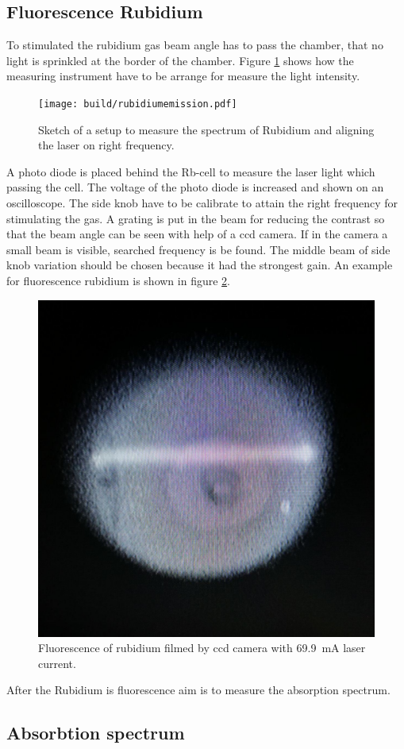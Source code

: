\subsection{Fluorescence Rubidium}%
\label{sub:anregen_rubidium}

To stimulated the rubidium gas beam angle has to pass the chamber, that no
light is sprinkled at the border of the chamber. 
Figure \ref{fig:hole_emission} shows how the measuring instrument have to be
arrange for measure the light intensity.
\begin{figure}[h]
		\centering
		\texttt{[image: build/rubidiumemission.pdf]}
		\caption{Sketch of a setup to measure the spectrum of Rubidium and
		aligning the laser on right frequency.\cite{anleitung}}
		\label{fig:hole_emission}
\end{figure}
A photo diode is placed behind the Rb-cell to measure the laser light which
passing the cell.
The voltage of the photo diode is increased and shown on an oscilloscope. 
The side knob have to be calibrate to attain the right frequency for stimulating
the gas. 
A grating is put in the beam for reducing the contrast so that the beam angle
can be seen with help of a ccd camera. 
If in the camera a small beam is visible, searched frequency is be found. 
The middle beam of side knob variation should be chosen because it had the
strongest gain.
An example for fluorescence rubidium is shown in figure \ref{fig:ionized}.
\begin{figure}[h]
		\centering
		\includegraphics[width=0.4\linewidth]{./content/pictures/fluorescence.jpg}
		\caption{Fluorescence of rubidium filmed by ccd camera with 
				\SI{69.9}{\milli\ampere} laser current.}
		\label{fig:ionized}
\end{figure}
After the Rubidium is fluorescence aim is to measure the absorption spectrum. 

\subsection{Absorbtion spectrum}%
\label{sub:absorbtion_spectrum}

